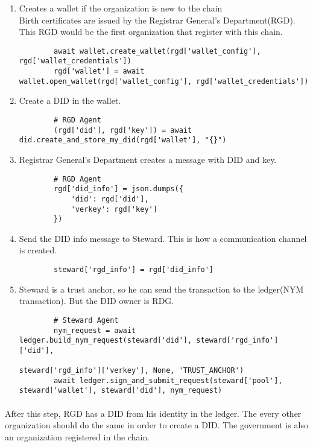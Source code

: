 \begin{enumerate}
    \item Creates a wallet if the organization is new to the chain\\
    Birth certificates are issued by the Registrar General’s Department(RGD). This RGD would be the first organization that register with this chain. 
    \begin{verbatim}
        await wallet.create_wallet(rgd['wallet_config'], rgd['wallet_credentials'])
        rgd['wallet'] = await wallet.open_wallet(rgd['wallet_config'], rgd['wallet_credentials'])
    \end{verbatim}

    \item Create a DID in the wallet.
    \begin{verbatim}
        # RGD Agent
        (rgd['did'], rgd['key']) = await did.create_and_store_my_did(rgd['wallet'], "{}")
    \end{verbatim}

    \item Registrar General’s Department creates a message with DID and key.
    \begin{verbatim}
        # RGD Agent
        rgd['did_info'] = json.dumps({
            'did': rgd['did'],
            'verkey': rgd['key']
        })
    \end{verbatim}

    \item Send the DID info message to Steward. This is how a communication channel is created.
    \begin{verbatim}
        steward['rgd_info'] = rgd['did_info'] 
    \end{verbatim}

    \item Steward is a trust anchor, so he can send the transaction to the ledger(NYM transaction). But the DID owner is RDG.
    \begin{verbatim}
        # Steward Agent
        nym_request = await ledger.build_nym_request(steward['did'], steward['rgd_info']['did'],
                                                    steward['rgd_info']['verkey'], None, 'TRUST_ANCHOR')
        await ledger.sign_and_submit_request(steward['pool'], steward['wallet'], steward['did'], nym_request)
    \end{verbatim}
\end{enumerate}

\paragraph{}
After this step, RGD has a DID from his identity in the ledger. The every other organization should do the same in order to create a DID. The government is also an organization registered in the chain.

